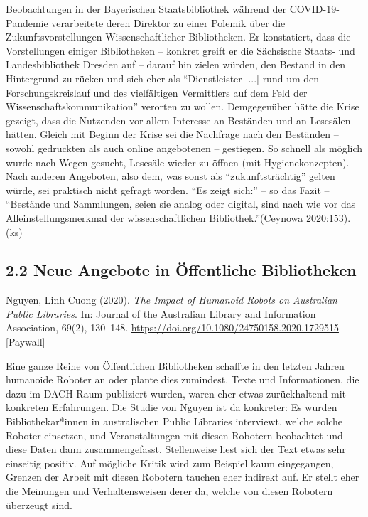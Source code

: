 \documentclass[a4paper,
fontsize=11pt,
oneside,
numbers=noperiodatend,
parskip=half-,
bibliography=totoc,
final
]{scrartcl}
\begin{document}
Beobachtungen in der Bayerischen Staatsbibliothek während der
COVID-19-Pandemie verarbeitete deren Direktor zu einer Polemik über die
Zukunftsvorstellungen Wissenschaftlicher Bibliotheken. Er konstatiert,
dass die Vorstellungen einiger Bibliotheken -- konkret greift er die
Sächsische Staats- und Landesbibliothek Dresden auf -- darauf hin zielen
würden, den Bestand in den Hintergrund zu rücken und sich eher als
\enquote{Dienstleister {[}...{]} rund um den Forschungskreislauf und des
vielfältigen Vermittlers auf dem Feld der Wissenschaftskommunikation}
verorten zu wollen. Demgegenüber hätte die Krise gezeigt, dass die
Nutzenden vor allem Interesse an Beständen und an Lesesälen hätten.
Gleich mit Beginn der Krise sei die Nachfrage nach den Beständen --
sowohl gedruckten als auch online angebotenen -- gestiegen. So schnell
als möglich wurde nach Wegen gesucht, Lesesäle wieder zu öffnen (mit
Hygienekonzepten). Nach anderen Angeboten, also dem, was sonst als
\enquote{zukunftsträchtig} gelten würde, sei praktisch nicht gefragt
worden. \enquote{Es zeigt sich:} -- so das Fazit -- \enquote{Bestände
und Sammlungen, seien sie analog oder digital, sind nach wie vor das
Alleinstellungsmerkmal der wissenschaftlichen Bibliothek.}(Ceynowa
2020:153). (ks)

\hypertarget{neue-angebote-in-uxf6ffentliche-bibliotheken}{%
\subsection{2.2 Neue Angebote in Öffentliche
Bibliotheken}\label{neue-angebote-in-uxf6ffentliche-bibliotheken}}

Nguyen, Linh Cuong (2020). \emph{The Impact of Humanoid Robots on
Australian Public Libraries}. In: Journal of the Australian Library and
Information Association, 69(2), 130--148.
\url{https://doi.org/10.1080/24750158.2020.1729515} {[}Paywall{]}

Eine ganze Reihe von Öffentlichen Bibliotheken schaffte in den letzten
Jahren humanoide Roboter an oder plante dies zumindest. Texte und
Informationen, die dazu im DACH-Raum publiziert wurden, waren eher etwas
zurückhaltend mit konkreten Erfahrungen. Die Studie von Nguyen ist da
konkreter: Es wurden Bibliothekar*innen in australischen Public
Libraries interviewt, welche solche Roboter einsetzen, und
Veranstaltungen mit diesen Robotern beobachtet und diese Daten dann
zusammengefasst. Stellenweise liest sich der Text etwas sehr einseitig
positiv. Auf mögliche Kritik wird zum Beispiel kaum eingegangen, Grenzen
der Arbeit mit diesen Robotern tauchen eher indirekt auf. Er stellt eher
die Meinungen und Verhaltensweisen derer da, welche von diesen Robotern
überzeugt sind.
\end{document}
